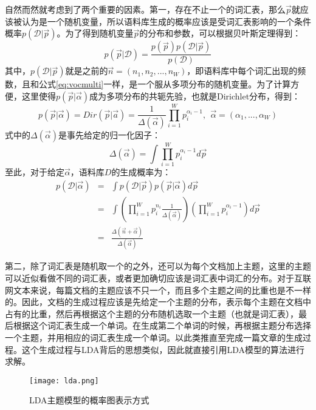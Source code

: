 自然而然就考虑到了两个重要的因素。第一，存在不止一个的词汇表，那么$\vec{p}$就应该被认为是一个随机变量，所以语料库生成的概率应该是受词汇表影响的一个条件概率$p(\mathcal{D}|\vec{p})$。为了得到随机变量$\vec{p}$的分布和参数，可以根据贝叶斯定理得到：
\begin{equation}
  p(\vec{p}|\mathcal{D})=\frac{p(\vec{p})p(\mathcal{D}|\vec{p})}{p(\mathcal{D})}
\end{equation}
其中，$p(\mathcal{D}|\vec{p})$就是之前的$\vec{n}=(n_1,n_2,...,n_W)$，即语料库中每个词汇出现的频数，且和公式\ref{eq:vocmulti}一样，是一个服从多项分布的随机变量。为了计算方便，这里使得$p(\vec{p}|\vec{\alpha})$成为多项分布的共轭先验，也就是Dirichlet分布，得到：
\begin{equation}
  p(\vec{p}|\vec{\alpha})=Dir(\vec{p}|\vec{a})=\frac{1}{\Delta(\vec{\alpha})}\prod_{i=1}^{W}p_i^{\alpha_i-1},~~\vec{\alpha}=(\alpha_1,...,\alpha_W)
\end{equation}
式中的$\Delta(\vec{\alpha})$是事先给定的归一化因子：
\begin{equation*}
  \Delta(\vec{\alpha})=\int \prod_{i=1}^{W}p_{i}^{\alpha_i-1}d\vec{p}
\end{equation*}
至此，对于给定$\vec{\alpha}$，语料库$D$的生成概率为：
\begin{eqnarray}
  p(\mathcal{D}|\vec{\alpha})&=&\int p(\mathcal{D}|\vec{p})p(\vec{p}|\vec{\alpha})d\vec{p} \\
                             &=&\int (\prod_{i=1}^{W}p_{i}^{n_i}\frac{1}{\Delta(\vec{\alpha})})(\prod_{i=1}^{W}p_{i}^{\alpha_i-1})d\vec{p} \\
                             &=&\frac{\Delta(\vec{n}+\vec{\alpha})}{\Delta(\vec{\alpha})}
\end{eqnarray}

第二，除了词汇表是随机取一个的之外，还可以为每个文档加上主题，这里的主题可以近似看做不同的词汇表，或者更加确切应该是词汇表中词汇的分布。对于互联网文本来说，每篇文档的主题应该不只一个，而且多个主题之间的比重也是不一样的。因此，文档的生成过程应该是先给定一个主题的分布，表示每个主题在文档中占有的比重，然后再根据这个主题的分布随机选取一个主题（也就是词汇表），最后根据这个词汇表生成一个单词。在生成第二个单词的时候，再根据主题分布选择一个主题，并用相应的词汇表生成一个单词。以此类推直至完成一篇文章的生成过程。这个生成过程与LDA背后的思想类似，因此就直接引用LDA模型的算法进行求解。

\begin{figure}
\centering
\texttt{[image: lda.png]}
\caption{LDA主题模型的概率图表示方式}
\label{fig:lda}
\end{figure}

